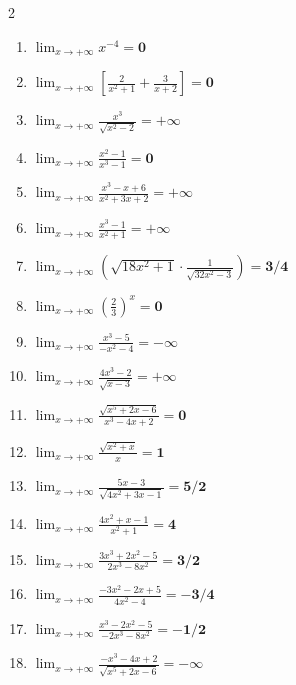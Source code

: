 \documentclass[12pt,a4paper]{article}
\begin{document}
\begin{multicols}{2}
\begin{enumerate}[label=1.\arabic*]
    \item $\displaystyle \lim_{x \to +\infty} x^{-4} = \mathbf{0}$
    \item $\displaystyle \lim_{x \to +\infty} \left[ \frac{2}{x^2+1} + \frac{3}{x+2} \right] = \mathbf{0}$
    \item $\displaystyle \lim_{x \to +\infty} \frac{x^3}{\sqrt{x^2-2}} = \mathbf{+\infty}$
    \item $\displaystyle \lim_{x \to +\infty} \frac{x^2-1}{x^3-1} = \mathbf{0}$
    \item $\displaystyle \lim_{x \to +\infty} \frac{x^3-x+6}{x^2+3x+2} = \mathbf{+\infty}$
    \item $\displaystyle \lim_{x \to +\infty} \frac{x^3-1}{x^2+1} = \mathbf{+\infty}$
    \item $\displaystyle \lim_{x \to +\infty} \left( \sqrt{18x^2+1}\cdot\frac{1}{\sqrt{32x^2-3}} \right) = \mathbf{3/4}$
    \item $\displaystyle \lim_{x \to +\infty} \left( \frac{2}{3} \right)^{\!x} = \mathbf{0}$
    \item $\displaystyle \lim_{x \to +\infty} \frac{x^3-5}{-x^2-4} = \mathbf{-\infty}$
    \item $\displaystyle \lim_{x \to +\infty} \frac{4x^3-2}{\sqrt{x-3}} = \mathbf{+\infty}$
    \item $\displaystyle \lim_{x \to +\infty} \frac{\sqrt{x^5+2x-6}}{x^3-4x+2} = \mathbf{0}$
    \item $\displaystyle \lim_{x \to +\infty} \frac{\sqrt{x^2+x}}{x} = \mathbf{1}$
    \item $\displaystyle \lim_{x \to +\infty} \frac{5x-3}{\sqrt{4x^2+3x-1}} = \mathbf{5/2}$
    \item $\displaystyle \lim_{x \to +\infty} \frac{4x^2+x-1}{x^2+1} = \mathbf{4}$
    \item $\displaystyle \lim_{x \to +\infty} \frac{3x^3+2x^2-5}{2x^3-8x^2} = \mathbf{3/2}$
    \item $\displaystyle \lim_{x \to +\infty} \frac{-3x^2-2x+5}{4x^2-4} = \mathbf{-3/4}$
    \item $\displaystyle \lim_{x \to +\infty} \frac{x^3-2x^2-5}{-2x^3-8x^2} = \mathbf{-1/2}$
    \item $\displaystyle \lim_{x \to +\infty} \frac{-x^3-4x+2}{\sqrt{x^5+2x-6}} = \mathbf{-\infty}$
\end{enumerate}
\end{multicols}
\end{document}

